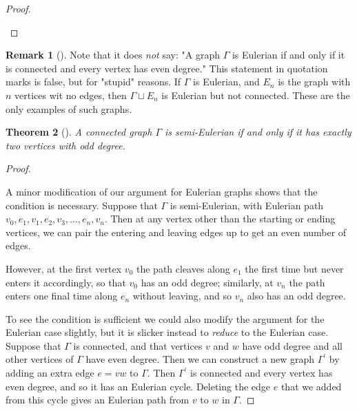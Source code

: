 \documentclass[10pt,]{book}
\theoremstyle{plain}
\newtheorem{theorem}{Theorem}[section]
\theoremstyle{definition}
\theoremstyle{definition}
\newtheorem{remark}[theorem]{Remark}
\theoremstyle{definition}
\theoremstyle{definition}
\numberwithin{equation}{section}
\begin{document}
\begin{proof}\hypertarget{proof-4}{}
\end{proof}
\begin{remark}[]\label{remark-1}
\hypertarget{p-138}{}%
Note that it does \emph{not} say: "A graph \(\Gamma\) is Eulerian if and only if it is connected and every vertex has even degree." This statement in quotation marks is false, but for "stupid" reasons.  If \(\Gamma\) is Eulerian, and \(E_n\) is the graph with \(n\) vertices wit no edges, then \(\Gamma\sqcup E_n\) is Eulerian but not connected.  These are the only examples of such graphs.%
\end{remark}
\begin{theorem}[{}]\label{theorem-3}
\hypertarget{p-139}{}%
A connected graph \(\Gamma\) is semi-Eulerian if and only if it has exactly two vertices with odd degree.%
\end{theorem}
\begin{proof}\hypertarget{proof-5}{}
\hypertarget{p-140}{}%
A minor modification of our argument for Eulerian graphs shows that the condition is necessary.  Suppose that \(\Gamma\) is semi-Eulerian, with Eulerian path \(v_0, e_1, v_1,e_2,v_3,\dots,e_n,v_n\).  Then at any vertex other than the starting or ending vertices, we can pair the entering and leaving edges up to get an even number of edges.%
\par
\hypertarget{p-141}{}%
However, at the first vertex \(v_0\) the path cleaves along \(e_1\) the first time but never enters it accordingly, so that \(v_0\) has an odd degree; similarly, at \(v_n\) the path enters one final time along \(e_n\) without leaving, and so \(v_n\) also has an odd degree.%
\par
\hypertarget{p-142}{}%
To see the condition is sufficient we could also modify the argument for the Eulerian case slightly, but it is slicker instead to \emph{reduce} to the Eulerian case.  Suppose that \(\Gamma\) is connected, and that vertices \(v\) and \(w\) have odd degree and all other vertices of \(\Gamma\) have even degree.  Then we can construct a new graph \(\Gamma^\prime\) by adding an extra edge \(e=vw\) to \(\Gamma\).  Then \(\Gamma^\prime\) is connected and every vertex has even degree, and so it has an Eulerian cycle.  Deleting the edge \(e\) that we added from this cycle gives an Eulerian path from \(v\) to \(w\) in \(\Gamma\).%
\end{proof}
\typeout{************************************************}
\typeout{************************************************}
\end{document}
